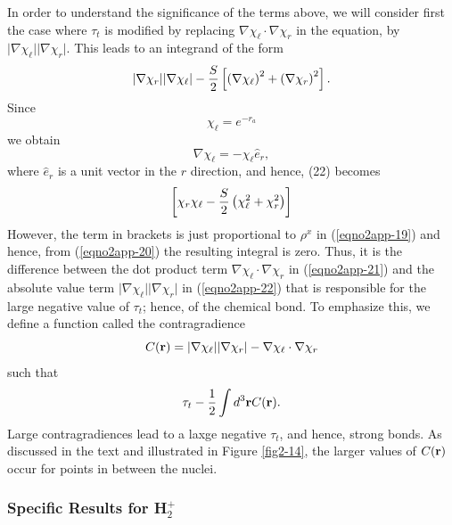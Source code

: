In order to understand the significance of the terms above, we will 
consider first the case where $\tau_t$ is modified by replacing 
$\nabla \chi_\ell \cdot \nabla \chi_r$ in the equation, by 
$\vert \nabla \chi_\ell \vert \vert \nabla \chi_r \vert$.  This leads to 
an integrand of the form
\begin{equation}
\vert \nabla \chi_r \vert \vert \nabla \chi_\ell \vert - {S \over 2} 
\left[ \left( \nabla \chi_\ell \right)^2 + \left( \nabla \chi_r 
\right)^2 \right] .
\label{eqno2app-22}
\end{equation}
Since
\begin{equation}
\chi_\ell = e^{-r_a}
\end{equation}
we obtain
\begin{equation}
\nabla \chi_\ell = - \chi_\ell {\hat e}_r ,
\end{equation}
where ${\hat e}_r$ is a unit vector in the $r$ direction, and hence,
(22) becomes
\begin{equation}
\left[ \chi_r \chi_\ell - {S \over 2} \left( \chi^2_\ell + \chi^2_r 
\right) \right]
\end{equation}
However, the term in brackets is just proportional to $\rho^x$ in
(\ref{eqno2app-19}) and hence, from (\ref{eqno2app-20}) the resulting
integral is zero. Thus, it is the difference between the dot product
term $\nabla \chi_\ell \cdot \nabla \chi_r$ in (\ref{eqno2app-21}) and
the absolute value term $\vert \nabla \chi_\ell \vert \vert \nabla
\chi_r \vert$ in (\ref{eqno2app-22}) that is responsible for the large
negative value of $\tau_t$; hence, of the chemical bond. To emphasize
this, we define a function called the contragradience
\begin{equation}
C ( {\bf r} ) = \vert \nabla \chi_\ell 
\vert \vert \nabla \chi_r \vert - \nabla \chi_\ell \cdot \nabla \chi_r
\end{equation}
such that
\begin{equation}
\tau_t - {1 \over 2} \int d^3 {\bf r} C ( {\bf r} ) .
\end{equation}
Large contragradiences lead to a laxge negative $\tau_t$, and hence,
strong bonds.  As discussed in the text and illustrated in Figure
\ref{fig2-14}, the larger values of $C( {\bf r})$ occur for points
in between the nuclei.

\subsubsection{Specific Results for H$^+_2$}

